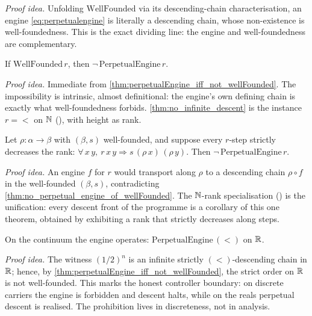 \emph{Proof idea.} Unfolding $\mathrm{WellFounded}$ via its descending-chain characterisation, an
engine \cref{eq:perpetualengine} is literally a descending chain, whose non-existence is
well-foundedness. This is the exact dividing line: the engine and well-foundedness are complementary.

\begin{theorem}\label{thm:no_perpetual_engine_of_wellFounded}
\green{}\; If $\mathrm{WellFounded}\,r$, then $\neg\,\mathrm{PerpetualEngine}\,r$.
\end{theorem}

\emph{Proof idea.} Immediate from \cref{thm:perpetualEngine_iff_not_wellFounded}. The impossibility
is intrinsic, almost definitional: the engine's own defining chain is exactly what
well-foundedness forbids. \cref{thm:no_infinite_descent} is the instance $r={<}$ on $\mathbb{N}$
(), with height as rank.

\begin{theorem}\label{thm:no_perpetual_engine_of_rank}
\green{}\; Let $\rho:\alpha\to\beta$ with $(\beta,s)$ well-founded, and suppose every $r$-step
strictly decreases the rank: $\forall\, x\,y,\ r\,x\,y \Rightarrow s\,(\rho\,x)\,(\rho\,y)$. Then
$\neg\,\mathrm{PerpetualEngine}\,r$. 
\end{theorem}

\emph{Proof idea.} An engine $f$ for $r$ would transport along $\rho$ to a descending chain
$\rho\circ f$ in the well-founded $(\beta,s)$, contradicting
\cref{thm:no_perpetual_engine_of_wellFounded}. The $\mathbb{N}$-rank specialisation
() is the unification: every descent front of the programme is
a corollary of this one theorem, obtained by exhibiting a rank that strictly decreases along steps.

\begin{theorem}\label{thm:perpetualEngine_on_real}
\green{}\; On the continuum the engine operates:
$\mathrm{PerpetualEngine}\,(<)$ on $\mathbb{R}$. 
\end{theorem}

\emph{Proof idea.} The witness $(1/2)^n$ is an infinite strictly $(<)$-descending chain in $\mathbb{R}$;
hence, by \cref{thm:perpetualEngine_iff_not_wellFounded}, the strict order on $\mathbb{R}$ is not
well-founded. This marks the honest controller boundary: on discrete carriers the engine is
forbidden and descent halts, while on the reals perpetual descent is realised. The prohibition
lives in discreteness, not in analysis.

